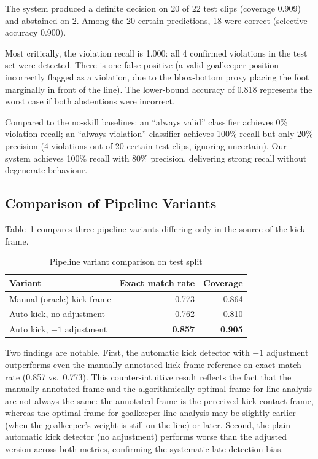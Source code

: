 \documentclass[12pt,a4paper,twoside]{article}
\begin{document}
The system produced a definite decision on 20 of 22 test clips (coverage 0.909)
and abstained on 2. Among the 20 certain predictions, 18 were correct (selective
accuracy 0.900).

Most critically, the violation recall is 1.000: all 4 confirmed violations in
the test set were detected. There is one false positive (a valid goalkeeper
position incorrectly flagged as a violation, due to the bbox-bottom proxy placing
the foot marginally in front of the line). The lower-bound accuracy of 0.818
represents the worst case if both abstentions were incorrect.

Compared to the no-skill baselines: an ``always valid'' classifier achieves 0\%
violation recall; an ``always violation'' classifier achieves 100\% recall but
only 20\% precision (4 violations out of 20 certain test clips, ignoring
uncertain). Our system achieves 100\% recall with 80\% precision, delivering
strong recall without degenerate behaviour.

\subsection{Comparison of Pipeline Variants}

Table~\ref{tab:variants} compares three pipeline variants differing only in
the source of the kick frame.

\begin{table}[H]
  \centering
  \caption{Pipeline variant comparison on test split}
  \label{tab:variants}
  \begin{tabular}{lrr}
    \toprule
    Variant & Exact match rate & Coverage \\
    \midrule
    Manual (oracle) kick frame & 0.773 & 0.864 \\
    Auto kick, no adjustment   & 0.762 & 0.810 \\
    Auto kick, $-1$ adjustment & \textbf{0.857} & \textbf{0.905} \\
    \bottomrule
  \end{tabular}
\end{table}

Two findings are notable. First, the automatic kick detector with $-1$ adjustment
outperforms even the manually annotated kick frame reference on exact match rate
(0.857 vs.\ 0.773). This counter-intuitive result reflects the fact that the
manually annotated frame and the algorithmically optimal frame for line analysis
are not always the same: the annotated frame is the perceived kick contact frame,
whereas the optimal frame for goalkeeper-line analysis may be slightly earlier
(when the goalkeeper's weight is still on the line) or later. Second, the plain
automatic kick detector (no adjustment) performs worse than the adjusted version
across both metrics, confirming the systematic late-detection bias.
\end{document}
